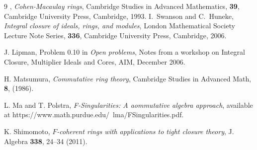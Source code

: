 \documentclass[10pt,a4paper]{amsart}
\theoremstyle{definition}
\theoremstyle{remark}
\begin{document}
\begin{thebibliography}{9}
, {\it Cohen-Macaulay rings},  Cambridge Studies in Advanced Mathematics,
{\bf 39},
Cambridge University Press, Cambridge, 1993.
 {I.~Swanson} and {C.~Huneke}, \emph{Integral closure of ideals, rings, and
	modules}, London Mathematical Society Lecture Note Series, {\bf
	336}, Cambridge University Press, Cambridge, 2006.



 J. Lipman, Problem 0.10 in \emph{Open problems}, Notes from a workshop
on Integral Closure, Multiplier Ideals and Cores, AIM, December 2006.

H. Matsumura, \emph{Commutative ring theory}, Cambridge Studies in Advanced Math, \textbf{8}, (1986).



 L. Ma and T. Polstra, 	\emph{F-Singularities: A aommutative algebra approach},   available at https://www.math.purdue.edu/~lma/FSingularities.pdf.

	

K. Shimomoto,
\emph{$F$-coherent rings with applications to tight closure theory},
J. Algebra {\bf338}, 24--34 (2011).










\end{thebibliography}
\end{document}
